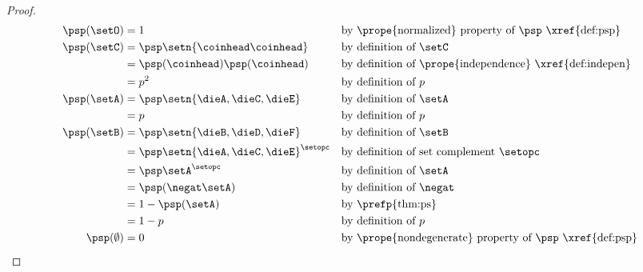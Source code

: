 \mbox{}\\
\begin{proof}
\begin{align*}
  \psp(\setO)
    &= 1
    && \text{by \prope{normalized} property of $\psp$ \xref{def:psp}}
  \\
  \psp(\setC)
    &= \psp\setn{\coinhead\coinhead}
    && \text{by definition of $\setC$}
  \\&= \psp(\coinhead)\psp(\coinhead)
    && \text{by definition of \prope{independence} \xref{def:indepen}}
  \\&= p^2
    && \text{by definition of $p$}
  \\
  \psp(\setA)
    &= \psp\setn{\dieA,\dieC,\dieE}
    && \text{by definition of $\setA$}
  \\&= p
    && \text{by definition of $p$}
  \\
  \psp(\setB)
    &= \psp\setn{\dieB,\dieD,\dieF}
    && \text{by definition of $\setB$}
  \\&= \psp\setn{\dieA,\dieC,\dieE}^\setopc
    && \text{by definition of set complement $\setopc$}
  \\&= \psp\setA^\setopc
    && \text{by definition of $\setA$}
  \\&= \psp(\negat\setA)
    && \text{by definition of $\negat$}
  \\&= 1-\psp(\setA)
    && \text{by \prefp{thm:ps}}
  \\&= 1-p
    && \text{by definition of $p$}
  \\
  \psp(\emptyset)
    &= 0
    && \text{by \prope{nondegenerate} property of $\psp$ \xref{def:psp}}
\end{align*}
\end{proof}

